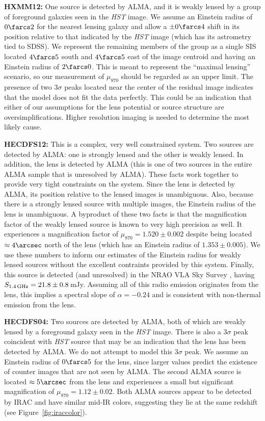 \documentclass[iop]{emulateapj}
\begin{document}
{\bf HXMM12:} One source is detected by ALMA, and it is weakly lensed by a group
of foreground galaxies seen in the {\it HST} image.  We assume an Einstein
radius of $0\farcs2$ for the nearest lensing galaxy and allow a $\pm0\farcs4$
shift in its position relative to that indicated by the {\it HST} image (which
has its astrometry tied to SDSS).  We represent the remaining members of the
group as a single SIS located $4\farcs5$ south and $4\farcs5$ east of the image
centroid and having an Einstein radius of $2\farcs0$.  This is meant to
represent the ``maximal lensing'' scenario, so our measurement of $\mu_{870}$
should be regarded as an upper limit.  The presence of two $3\sigma$ peaks
located near the center of the residual image indicates that the model does not
fit the data perfectly.  This could be an indication that either of our
assumptions for the lens potential or source structure are oversimplifications.
Higher resolution imaging is needed to determine the most likely cause.

{\bf HECDFS12:} This is a complex, very well constrained system.  Two sources
are detected by ALMA: one is strongly lensed and the other is weakly lensed.
In addition, the lens is detected by ALMA (this is one of two sources in the
entire ALMA sample that is unresolved by ALMA).  These facts work together to
provide very tight constraints on the system.  Since the lens is detected by
ALMA, its position relative to the lensed images is unambiguous.  Also, because
there is a strongly lensed source with multiple images, the Einstein radius of
the lens is unambiguous.  A byproduct of these two facts is that the
magnification factor of the weakly lensed source is known to very high
precision as well.  It experiences a magnification factor of $\mu_{870} =
1.520\pm0.002$ despite being located $\approx4\arcsec$ north of the lens (which
has an Einstein radius of $1.353\pm0.005$).  We use these numbers to inform our
estimates of the Einstein radius for weakly lensed sources without the
excellent contraints provided by this system.  Finally, this source is detected
(and unresolved) in the NRAO VLA Sky Survey \citep{Condon:1998uq}, having
$S_{\rm 1.4\,GHz} = 21.8 \pm 0.8\,$mJy.  Assuming all of this radio emission
originates from the lens, this implies a spectral slope of $\alpha = -0.24$ and
is consistent with non-thermal emission from the lens.

{\bf HECDFS04:} Two sources are detected by ALMA, both of which are weakly
lensed by a foreground galaxy seen in the {\it HST} image.  There is also a
3$\sigma$ peak coincident with {\it HST} source that may be an indication that
the lens has been detected by ALMA.  We do not attempt to model this 3$\sigma$
peak.  We assume an Einstein radius of $0\farcs5$ for the lens, since larger
values predict the existence of counter images that are not seen by ALMA.  The
second ALMA source is located $\approx5\arcsec$ from the lens and experiences a
small but significant magnification of $\mu_{870} = 1.12 \pm 0.02$.  Both ALMA
sources appear to be detected by IRAC and have similar mid-IR colors, suggesting
they lie at the same redshift (see Figure~\ref{fig:iraccolor}).  
\end{document}
